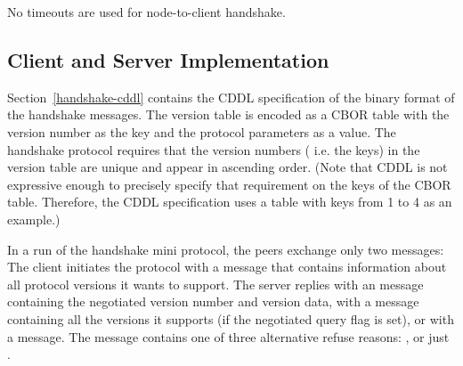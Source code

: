 No timeouts are used for node-to-client handshake.

\subsection{Client and Server Implementation}
\label{sec:handshake-implementation}
Section~\ref{handshake-cddl} contains the CDDL specification of the binary format of the handshake messages.
The version table is encoded as a CBOR table with the version number as the key
and the protocol parameters as a value.
The handshake protocol requires that the version numbers ( i.e. the keys) in the version table are unique
and appear in ascending order.
(Note that CDDL is not expressive enough to precisely specify that requirement on the keys of the CBOR
table. Therefore, the CDDL specification uses a table with keys from 1 to 4 as an example.)

In a run of the handshake mini protocol, the peers exchange only two messages:
The client initiates the protocol with a \MsgProposeVersions{} message that
contains information about all protocol versions it wants to support. The
server replies with an \MsgAcceptVersion{} message containing the negotiated
version number and version data, with a \MsgQueryReply{} message containing
all the versions it supports (if the negotiated query flag is set), or with
a \MsgRefuse{} message.
The \MsgRefuse{} message contains one of three alternative refuse reasons:
\VersionMismatch{}, \HandshakeDecodeError{} or just \Refused{}.

